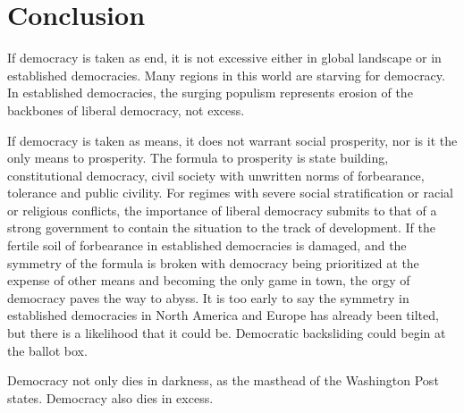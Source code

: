 \documentclass{scrartcl}
\theoremstyle{definition}
\begin{document}
\bigskip{}


\section{Conclusion}

If democracy is taken as end, it is not excessive either in global
landscape or in established democracies. Many regions in this world
are starving for democracy. In established democracies, the surging
populism represents erosion of the backbones of liberal democracy,
not excess. 

If democracy is taken as means, it does not warrant social prosperity,
nor is it the only means to prosperity. The formula to prosperity
is state building, constitutional democracy, civil society with unwritten
norms of forbearance, tolerance and public civility. For regimes with
severe social stratification or racial or religious conflicts, the
importance of liberal democracy submits to that of a strong government
to contain the situation to the track of development. If the fertile
soil of forbearance in established democracies is damaged, and the
symmetry of the formula is broken with democracy being prioritized
at the expense of other means and becoming the only game in town,
the orgy of democracy paves the way to abyss. It is too early to say
the symmetry in established democracies in North America and Europe
has already been tilted, but there is a likelihood that it could be.
Democratic backsliding could begin at the ballot box. 

Democracy not only dies in darkness, as the masthead of the Washington
Post states. Democracy also dies in excess. 

\printbibliography %
\end{document}
